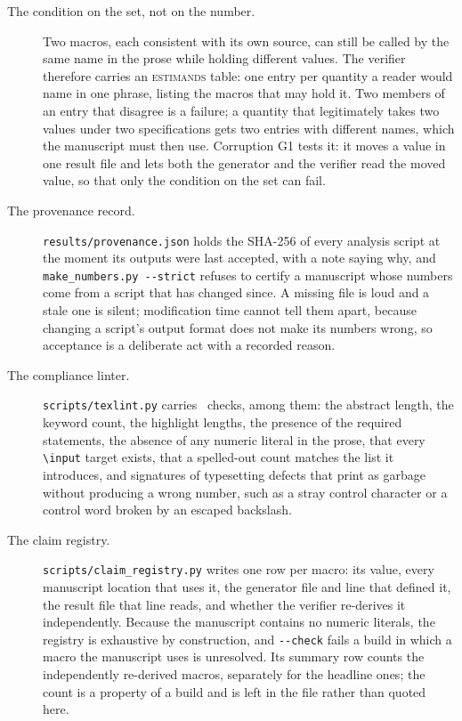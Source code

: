 \begin{description}
\item[The condition on the set, not on the number.] Two macros, each
consistent with its own source, can still be called by the same name in the
prose while holding different values. The verifier therefore carries an
\textsc{estimands} table: one entry per quantity a reader would name in one
phrase, listing the macros that may hold it. Two members of an entry that
disagree is a failure; a quantity that legitimately takes two values under two
specifications gets two entries with different names, which the manuscript
must then use. Corruption \textsf{G1} tests it: it moves a value in one
result file and lets both the generator and the verifier read the moved
value, so that only the condition on the set can fail.

\item[The provenance record.] \texttt{results/provenance.json} holds the
SHA-256 of every analysis script at the moment its outputs were last accepted,
with a note saying why, and \texttt{make\_numbers.py -{}-strict} refuses to
certify a manuscript whose numbers come from a script that has changed since.
A missing file is loud and a stale one is silent; modification time cannot
tell them apart, because changing a script's output format does not make its
numbers wrong, so acceptance is a deliberate act with a recorded reason.

\item[The compliance linter.] \texttt{scripts/texlint.py} carries
\nLintChecks\ checks, among them: the abstract length, the keyword count, the
highlight lengths, the presence of the required statements, the absence of
any numeric literal in the prose, that every \texttt{\textbackslash input}
target exists, that a spelled-out count matches the list it introduces, and
signatures of typesetting defects that print as garbage without producing a
wrong number, such as a stray control character or a control word broken by
an escaped backslash.

\item[The claim registry.] \texttt{scripts/claim\_registry.py} writes one row
per macro: its value, every manuscript location that uses it, the generator
file and line that defined it, the result file that line reads, and whether
the verifier re-derives it independently. Because the manuscript contains no
numeric literals, the registry is exhaustive by construction, and
\texttt{-{}-check} fails a build in which a macro the manuscript uses is
unresolved. Its summary row counts the independently re-derived macros,
separately for the headline ones; the count is a property of a build and is
left in the file rather than quoted here.
\end{description}

